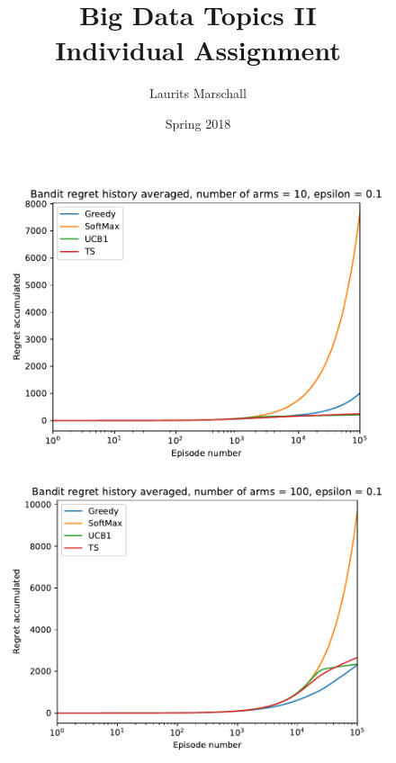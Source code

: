 \documentclass[11pt]{article}
\title{Big Data Topics II \\ Individual Assignment}
\author{Laurits Marschall}
\date{Spring 2018}
\begin{document}
\maketitle

\newpage


\begin{figure}[h!]
    \includegraphics{regrets_10_01.pdf}
    \centering
\end{figure}

\begin{figure}[h!]
	\includegraphics{regrets_100_01.pdf}
	\centering
\end{figure}
\end{document}
